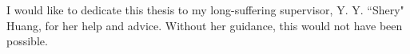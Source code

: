 
\begin{dedication}

I would like to dedicate this thesis to my long-suffering supervisor, Y. Y. ``Shery" Huang, for her help and advice. Without her guidance, this would not have been possible.

\end{dedication}

